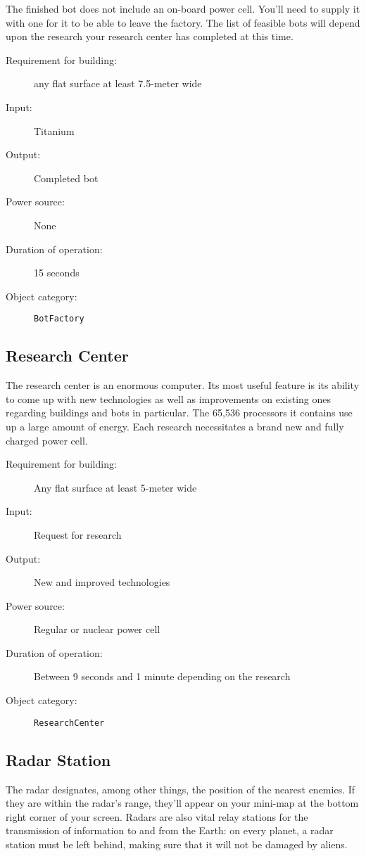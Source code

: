 The finished bot does not include an on-board power cell. You'll need to supply it with one for it to be able to leave the factory. The list of feasible bots will depend upon the research your research center has completed at this time.

\begin{description}
    \item[Requirement for building:] any flat surface at least 7.5-meter wide
    \item[Input:] Titanium
    \item[Output:] Completed bot
    \item[Power source:] None
    \item[Duration of operation:] 15 seconds
    \item[Object category:] \texttt{BotFactory}
\end{description}


\subsection{Research Center}

The research center is an enormous computer. Its most useful feature is its ability to come up with new technologies as well as improvements on existing ones regarding buildings and bots in particular. The 65,536 processors it contains use up a large amount of energy. Each research necessitates a brand new and fully charged power cell.

\begin{description}
    \item[Requirement for building:] Any flat surface at least 5-meter wide
    \item[Input:] Request for research
    \item[Output:] New and improved technologies
    \item[Power source:] Regular or nuclear power cell
    \item[Duration of operation:] Between 9 seconds and 1 minute depending on the research
    \item[Object category:] \texttt{ResearchCenter}
\end{description}


\subsection{Radar Station}

The radar designates, among other things, the position of the nearest enemies. If they are within the  radar's range, they'll appear on your mini-map at the bottom right corner of your screen. Radars are also vital relay stations for the transmission of information to and from the Earth: on every planet, a radar station must be left behind, making sure that it will not be damaged by aliens.

